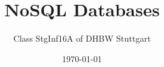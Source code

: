 \documentclass[
  12pt,
  a4paper,
  parskip,
  openany
]{scrbook}
\title{NoSQL Databases}
\author{Class StgInf16A of DHBW Stuttgart}
\date{\today}
\begin{document}
\maketitle
\tableofcontents


\printglossaries












\printbibliography

\appendix

\end{document}
